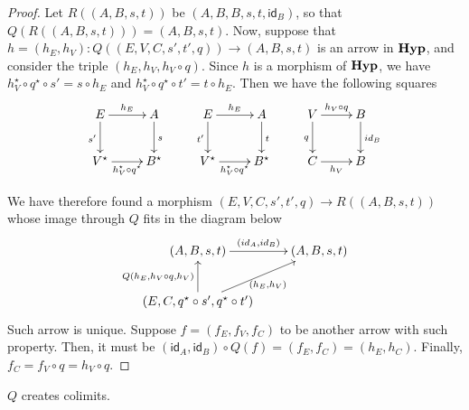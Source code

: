 \documentclass[a4paper,UKenglish,cleveref,pdftex,thm-restate,numberwithinsect]{lipics-v2021}
\newcommand{\catname}[1]{\textbf{\textup{#1}}}
\newcommand{\hyp}{\catname{Hyp}}
\newcommand{\id}[1]{\mathsf{id}_{#1}}
\begin{document}
\begin{proof}
	Let $R((A, B, s, t))$ be $(A, B, B, s, t, \id{B})$, so that $Q(R((A, B, s, t))) = (A, B, s, t)$. Now, suppose that $h = (h_E, h_V): Q((E, V, C, s', t', q)) \to (A, B, s, t)$  is an arrow in $\hyp$, and consider the triple $(h_E, h_V, h_V \circ q)$. Since $h$ is a morphism of $\hyp$, we have $h_V^{\star}\circ q^{\star}\circ s'= s\circ h_E$ and $h_V^{\star}\circ q^{\star}\circ t' = t\circ h_E$.
	Then we have the following squares
	\[\xymatrix{
		E \ar[r]^{h_E}\ar[d]_{s'} & A \ar[d]^{s} & E \ar[r]^{h_E}\ar[d]_{t'} & A \ar[d]^{t} & V \ar[r]^{h_V \circ q} \ar[d]_{q} & B \ar[d]^{\id{B}} \\
		V^{\star} \ar[r]_{h_V^\star\circ q^\star} & B^{\star} & V^{\star} \ar[r]_{h_V^\star\circ q^\star} & B^{\star} & C \ar[r]_{h_V} & B
	}\]
	
	\iffalse\[
	\begin{tikzcd}
		E \arrow[r, "{h_E}"] \arrow[d, "{s_G}"swap] & A \arrow[d, "s"] \\
		V \arrow[r, "{h_V \circ q}"swap] & B
	\end{tikzcd}
	\qquad
	\begin{tikzcd}
		E \arrow[r, "{h_E}"] \arrow[d, "{t_G}"swap] & A \arrow[d, "t"] \\
		V \arrow[r, "{h_V \circ q}"swap] & B
	\end{tikzcd}
	\qquad
	\begin{tikzcd}
		V \arrow[r, "{h_V\circ q}"] \arrow[d, "q" swap] & B \arrow[d, "{id_B}"] \\
		C \arrow[r, "{h_V}"swap] & B
	\end{tikzcd}
	\]\fi
	We have therefore found a morphism $(E, V, C, s', t', q) \to R((A, B, s, t))$ whose image through $Q$ fits in the diagram below
	\[\xymatrix{
		(A, B, s, t) \ar[r]^{(\id{A}, \id{B})} & (A, B, s, t)\\
		(E, C, q^\star\circ s', q^\star\circ t') \ar[u]^{Q(h_E, h_V \circ q, h_V)} \ar[ur]_{(h_E, h_V)}
	}\]   
	Such arrow is unique. Suppose $f = (f_E, f_V, f_C)$ to be another arrow with such property.
	Then, it must be $(\id A, \id B) \circ Q(f) = (f_E, f_C) = (h_E, h_C)$. Finally, $f_C = f_V \circ q = h_V \circ q$. 
\end{proof}

\begin{proposition}\label{prop:quot_creat_colims}
	$Q$ creates colimits.
\end{proposition}
\end{document}

